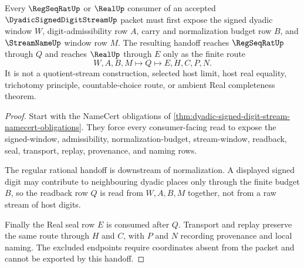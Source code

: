 \begin{theorem}
\label{thm:dyadic-signed-digit-stream-regseqrat-handoff}
Every $\RegSeqRatUp$ or $\RealUp$ consumer of an accepted $\DyadicSignedDigitStreamUp$ packet must first expose the signed dyadic window $W$, digit-admissibility row $A$, carry and normalization budget row $B$, and $\StreamNameUp$ window row $M$. The resulting handoff reaches $\RegSeqRatUp$ through $Q$ and reaches $\RealUp$ through $E$ only as the finite route
$$
W,A,B,M \longmapsto Q \longmapsto E,H,C,P,N .
$$
It is not a quotient-stream construction, selected host limit, host real equality, trichotomy principle, countable-choice route, or ambient Real completeness theorem.
\end{theorem}
\begin{proof}
Start with the NameCert obligations of \autoref{thm:dyadic-signed-digit-stream-namecert-obligations}. They force every consumer-facing read to expose the signed-window, admissibility, normalization-budget, stream-window, readback, seal, transport, replay, provenance, and naming rows.

The regular rational handoff is downstream of normalization. A displayed signed digit may contribute to neighbouring dyadic places only through the finite budget $B$, so the readback row $Q$ is read from $W,A,B,M$ together, not from a raw stream of host digits.

Finally the Real seal row $E$ is consumed after $Q$. Transport and replay preserve the same route through $H$ and $C$, with $P$ and $N$ recording provenance and local naming. The excluded endpoints require coordinates absent from the packet and cannot be exported by this handoff.
\end{proof}



